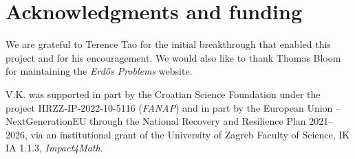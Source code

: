 \documentclass[11pt,letterpaper,reqno]{amsart}
\numberwithin{equation}{section}
\theoremstyle{remark}
\newcommand{\1}{\mathbf 1}
\begin{document}
\section*{Acknowledgments and funding}
We are grateful to Terence Tao for the initial breakthrough that enabled this project and for his encouragement. We would also like to thank Thomas Bloom for maintaining the \emph{Erd\H{o}s Problems} website.

V.K. was supported in part by the Croatian Science Foundation under the project HRZZ-IP-2022-10-5116 (\emph{FANAP}) and in part by the European Union -- NextGenerationEU through the National Recovery and Resilience Plan 2021--2026, via an institutional grant of the University of Zagreb Faculty of Science, IK IA 1.1.3, \emph{Impact4Math}.




\end{document}
